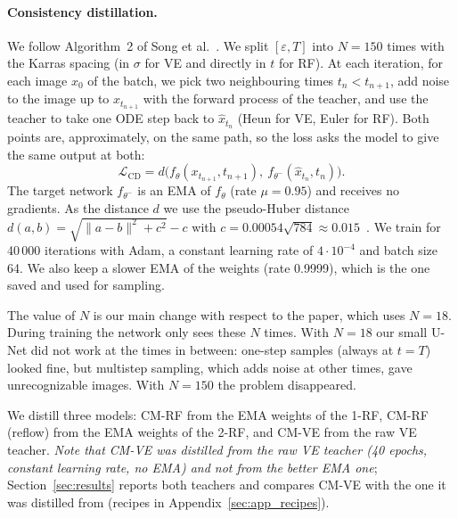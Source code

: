 \documentclass{article}
\begin{document}
\paragraph{Consistency distillation.} We follow Algorithm~2 of Song et
al.~\cite{song2023consistency}. We split $[\varepsilon, T]$ into $N = 150$ times
with the Karras spacing (in $\sigma$ for VE and directly in $t$ for RF). At each
iteration, for each image $x_0$ of the batch, we pick two neighbouring times
$t_n < t_{n+1}$, add noise to the image up to $x_{t_{n+1}}$ with the forward
process of the teacher, and use the teacher to take one ODE step back to
$\hat{x}_{t_n}$ (Heun for VE, Euler for RF). Both points are, approximately, on
the same path, so the loss asks the model to give the same output at both:
\begin{equation}
  \mathcal{L}_\text{CD} = d\big(f_\theta(x_{t_{n+1}}, t_{n+1}),\ f_{\theta^-}(\hat{x}_{t_n}, t_n)\big).
\end{equation}
The target network $f_{\theta^-}$ is an EMA of $f_\theta$ (rate $\mu = 0.95$)
and receives no gradients. As the distance $d$ we use the pseudo-Huber distance
$d(a, b) = \sqrt{\|a - b\|^2 + c^2} - c$ with
$c = 0.00054\sqrt{784} \approx 0.015$~\cite{song2024improved}. We train for
40\,000 iterations with Adam, a constant learning rate of $4\cdot10^{-4}$ and
batch size 64. We also keep a slower EMA of the weights (rate 0.9999), which is
the one saved and used for sampling.

The value of $N$ is our main change with respect to the paper, which uses
$N = 18$. During training the network only sees these $N$ times. With $N = 18$
our small U-Net did not work at the times in between: one-step samples (always
at $t = T$) looked fine, but multistep sampling, which adds noise at other
times, gave unrecognizable images. With $N = 150$ the problem disappeared.

We distill three models: CM-RF from the EMA weights of the 1-RF, CM-RF
(reflow) from the EMA weights of the 2-RF, and CM-VE from the raw VE teacher.
\emph{Note that CM-VE was distilled from the raw VE teacher (40 epochs, constant
learning rate, no EMA) and not from the better EMA one}; Section~\ref{sec:results}
reports both teachers and compares CM-VE with the one it was distilled from
(recipes in Appendix~\ref{sec:app_recipes}).
\end{document}
